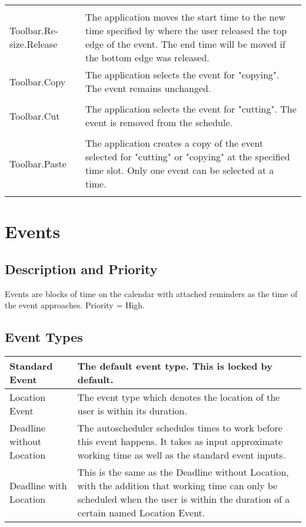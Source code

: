 \documentclass{scrreprt}
\begin{document}
\begin{center}
\begin{longtable}{ | p{6cm} | p{9cm} | }
    & \\
    Toolbar.Re-size.Release & The application moves the start time to the new time
    specified by where the user released the top edge of the event. The end time
    will be moved if the bottom edge was released.\\
    \hline
    Toolbar.Copy & The application selects the event for "copying". The
    event remains unchanged.\\
    & \\
    Toolbar.Cut & The application selects the event for "cutting". The
    event is removed from the schedule.\\
    & \\
    Toolbar.Paste & The application creates a copy of the event selected
    for "cutting" or "copying" at the specified time slot. Only one
    event can be selected at a time.\\
    & \\
    \hline
    \end{longtable}
\end{center}

\section{Events}

\subsection{Description and Priority}
Events are blocks of time on the calendar with attached reminders as the time of the event approaches. Priority = High.

\subsection{Event Types}
\begin{center}
\begin{tabular}{ | p{5cm} | p{10cm} | }
\hline
Standard Event &
The default event type. This is locked by default.\\
\hline
Location Event &
The event type which denotes the location of the user is within its duration.\\
\hline
Deadline without Location &
The autoscheduler schedules times to work before this event happens. It takes as input
approximate working time as well as the standard event inputs.\\
\hline
Deadline with Location &
This is the same as the Deadline without Location, with the addition
that working time can only be scheduled when the user is within the duration of a certain named Location Event.\\
\hline
\end{tabular}
\end{center}
\end{document}
